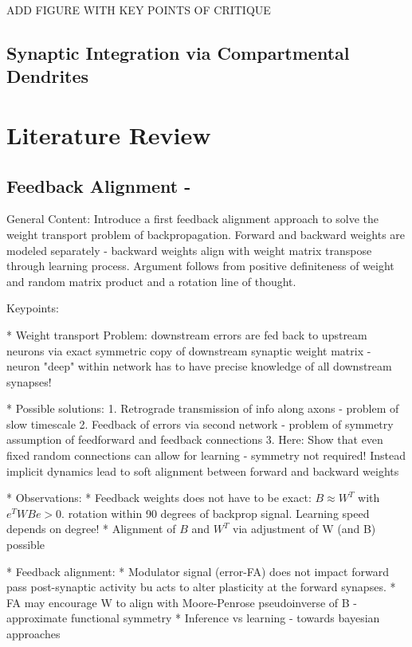 \documentclass{article}
\theoremstyle{definition}
\begin{document}
ADD FIGURE WITH KEY POINTS OF CRITIQUE

\subsection*{Synaptic Integration via Compartmental Dendrites}


\newpage
\section{Literature Review}

\subsection*{Feedback Alignment - \citet{lillicrap2016}}

General Content: Introduce a first feedback alignment approach to solve the weight transport problem of backpropagation. Forward and backward weights are modeled separately - backward weights align with weight matrix transpose through learning process. Argument follows from positive definiteness of weight and random matrix product and a rotation line of thought.


Keypoints:

* Weight transport Problem: downstream errors are fed back to upstream neurons via exact symmetric copy of downstream synaptic weight matrix - neuron "deep" within network has to have precise knowledge of all downstream synapses!

* Possible solutions:
    1. Retrograde transmission of info along axons - problem of slow timescale
    2. Feedback of errors via second network - problem of symmetry assumption of feedforward and feedback connections
    3. Here: Show that even fixed random connections can allow for learning - symmetry not required! Instead implicit dynamics lead to soft alignment between forward and backward weights

* Observations:
    * Feedback weights does not have to be exact: $B \approx W^T$ with $e^TWBe > 0$. rotation within 90 degrees of backprop signal. Learning speed depends on degree!
    * Alignment of $B$ and $W^T$ via adjustment of W (and B) possible

* Feedback alignment:
    * Modulator signal (error-FA) does not impact forward pass post-synaptic activity bu acts to alter plasticity at the forward synapses.
    * FA may encourage W to align with Moore-Penrose pseudoinverse of B - approximate functional symmetry
    * Inference vs learning - towards bayesian approaches
\end{document}
